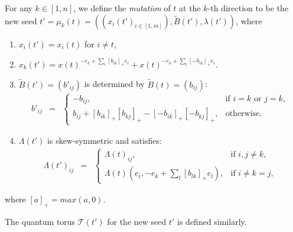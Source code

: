 \documentclass[10pt]{amsart}
\theoremstyle{theorems}
\begin{document}
For any $k\in [1,n]$, we define the \emph{mutation} of $t$ at the $k$-th direction to be the new seed $t'=\mu_k(t)=((x_i(t')_{i\in [1,m]}), \widetilde B(t'),\lambda(t'))$, where
\begin{enumerate}[$(1)$]

\item $x_i(t')=x_i(t)$ for $i\neq t$,

\item $x_k(t')=x(t)^{-e_k+\sum_i[b_{ik}]_{+}e_i}+x(t)^{-e_k+\sum_i[-b_{ik}]_{+}e_i}$.

\item $\widetilde{B}(t')=(b'_{ij})$ is determined by $\widetilde B(t)=(b_{ij})$:
\[\begin{array}{ccl} b'_{ij} &=&
         \left\{\begin{array}{ll}
              -b_{ij}, &\mbox{if $i=k$ or $j=k$},  \\
              b_{ij}+[b_{ik}]_{+}[b_{kj}]_{+}-[-b_{ik}]_{+}[-b_{kj}]_{+}, &\mbox{otherwise}.
         \end{array}\right.
 \end{array}\]

\item $\Lambda(t')$ is skew-symmetric and satisfies:
\[\begin{array}{ccl} \Lambda(t')_{ij} &=&
         \left\{\begin{array}{ll}
              \Lambda(t)_{ij}, &\mbox{if $i,j\neq k$},  \\
              \Lambda(t)(e_i,-e_k+\sum_{l}[b_{lk}]_{+}e_l), &\mbox{if $i\neq k=j$},
         \end{array}\right.
 \end{array}\]

\end{enumerate}
where $[a]_{+}=max(a,0)$.

\medskip

The quantum torus $\mathcal T(t')$ for the new seed $t'$ is defined similarly.

\medskip
\end{document}
